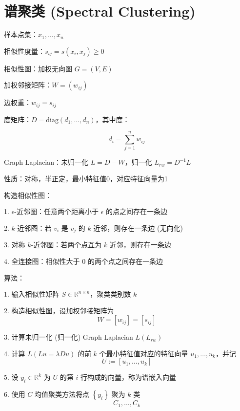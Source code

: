 \documentclass[openany,a4paper,12pt]{ctexbook}
\theoremstyle{kaiti}
\theoremstyle{normal}
\begin{document}
\section{谱聚类 (Spectral Clustering) }

样本点集：$x_1,\dots ,x_n$

相似性度量：$s_{ij}=s\left(x_i,x_j \right)\geqslant 0$

相似性图：加权无向图 $G=\left(V,E \right)$

加权邻接矩阵：$W=\left(w_{ij} \right)$

边权重：$w_{ij}=s_{ij}$

度矩阵：$D=\mathrm{diag}\left(d_1,\dots ,d_n \right)$，其中度：

\begin{equation}
d_i=\sum_{j=1}^{n}w_{ij}
\end{equation}

Graph Laplacian：未归一化 $L=D-W$，归一化 $L_{rw}=D^{-1}L$

性质：对称，半正定，最小特征值0，对应特征向量为1

构造相似性图：

1. $\epsilon$-近邻图：任意两个距离小于 $\epsilon$ 的点之间存在一条边

2. $k$-近邻图：若 $v_i$ 是 $v_j$ 的 $k$ 近邻，则存在一条边 (无向化) 

3. 对称 $k$-近邻图：若两个点互为 $k$ 近邻，则存在一条边

4. 全连接图：相似性大于 0 的两个点之间存在一条边

算法：

1. 输入相似性矩阵 $S\in \mathbb{R} ^{n\times n}$，聚类类别数 $k$

2. 构造相似性图，设加权邻接矩阵为 
\begin{equation}
  W=[w_{ij}]=[s_{ij}]
\end{equation}

3. 计算未归一化 (归一化) Graph Laplacian $L\left(L_{rw} \right)$

4. 计算 $L\left(Lu=\lambda Du \right)$ 的前 $k$ 个最小特征值对应的特征向量 $u_1,\dots ,u_k$，并记 
\begin{equation}
  U:=\left[u_1,\dots ,u_k \right]
\end{equation}

5. 设 $y_i\in \mathbb{R} ^k$ 为 $U$ 的第 $i$ 行构成的向量，称为谱嵌入向量

6. 使用 $C$ 均值聚类方法将点 $\left\{ y_i \right\}$ 聚为 $k$ 类 
  \begin{equation}
C_1,\dots ,C_k
\end{equation}
\end{document}
